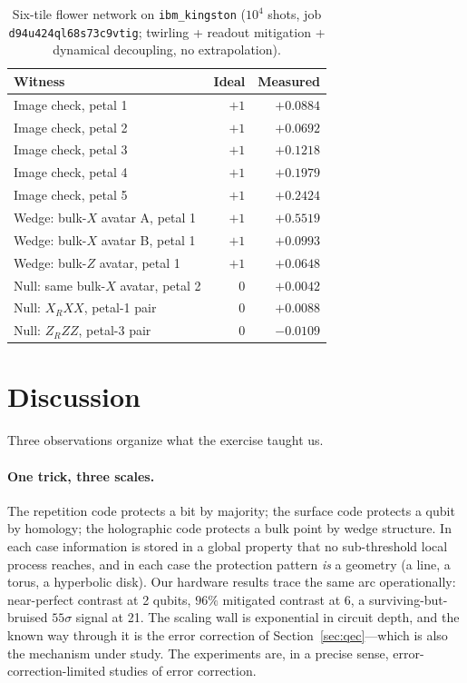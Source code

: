 \documentclass[11pt]{article}
\begin{document}
\begin{table}[t]
\centering
\small
\begin{tabular}{lrr}
\toprule
Witness & Ideal & Measured \\
\midrule
Image check, petal 1 & $+1$ & $+0.0884$ \\
Image check, petal 2 & $+1$ & $+0.0692$ \\
Image check, petal 3 & $+1$ & $+0.1218$ \\
Image check, petal 4 & $+1$ & $+0.1979$ \\
Image check, petal 5 & $+1$ & $+0.2424$ \\
Wedge: bulk-$X$ avatar A, petal 1 & $+1$ & $+0.5519$ \\
Wedge: bulk-$X$ avatar B, petal 1 & $+1$ & $+0.0993$ \\
Wedge: bulk-$Z$ avatar, petal 1 & $+1$ & $+0.0648$ \\
Null: same bulk-$X$ avatar, petal 2 & $0$ & $+0.0042$ \\
Null: $X_R XX$, petal-1 pair & $0$ & $+0.0088$ \\
Null: $Z_R ZZ$, petal-3 pair & $0$ & $-0.0109$ \\
\bottomrule
\end{tabular}
\caption{Six-tile flower network on \texttt{ibm\_kingston}
($10^4$ shots, job \texttt{d94u424ql68s73c9vtig}; twirling + readout
mitigation + dynamical decoupling, no extrapolation).}
\label{tab:flower}
\end{table}

\section{Discussion}
\label{sec:discussion}

Three observations organize what the exercise taught us.

\paragraph{One trick, three scales.} The repetition code protects a bit
by majority; the surface code protects a qubit by homology; the
holographic code protects a bulk point by wedge structure. In each case
information is stored in a global property that no sub-threshold local
process reaches, and in each case the protection pattern \emph{is} a
geometry (a line, a torus, a hyperbolic disk). Our hardware results
trace the same arc operationally: near-perfect contrast at 2 qubits,
$96\%$ mitigated contrast at 6, a surviving-but-bruised $55\sigma$
signal at 21. The scaling wall is exponential in circuit depth, and the
known way through it is the error correction of
Section~\ref{sec:qec}---which is also the mechanism under study. The
experiments are, in a precise sense, error-correction-limited studies of
error correction.
\end{document}
